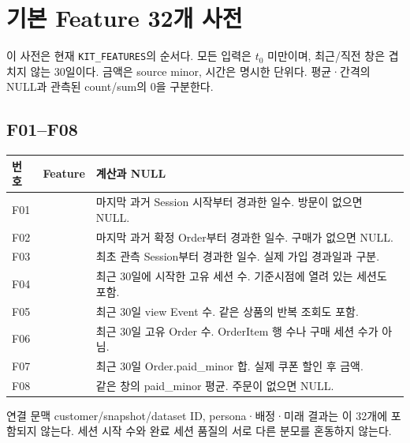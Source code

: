 \documentclass[11pt,a4paper]{article}
\newcommand{\code}[1]{{\ttfamily\footnotesize\nolinkurl{#1}}}
\newcommand{\page}{\clearpage}
\newcommand{\thead}{\rowcolor{pale}}
\begin{document}
\page
\section{기본 Feature 32개 사전}
이 사전은 현재 \code{KIT_FEATURES}의 순서다. 모든 입력은 $t_0$ 미만이며, 최근/직전 창은 겹치지 않는 30일이다. 금액은 source minor, 시간은 명시한 단위다. 평균·간격의 NULL과 관측된 count/sum의 0을 구분한다.

\subsection*{F01--F08}
\begin{tabularx}{\linewidth}{@{}P{.065\linewidth}P{.36\linewidth}Y@{}}\thead 번호 & Feature & 계산과 NULL\\\midrule
F01 & {\ttfamily\scriptsize{}} & 마지막 과거 Session 시작부터 경과한 일수. 방문이 없으면 NULL. \\[5pt]
F02 & {\ttfamily\scriptsize{}} & 마지막 과거 확정 Order부터 경과한 일수. 구매가 없으면 NULL. \\[5pt]
F03 & {\ttfamily\scriptsize{}} & 최초 관측 Session부터 경과한 일수. 실제 가입 경과일과 구분. \\[5pt]
F04 & {\ttfamily\scriptsize{}} & 최근 30일에 시작한 고유 세션 수. 기준시점에 열려 있는 세션도 포함. \\[5pt]
F05 & {\ttfamily\scriptsize{}} & 최근 30일 view Event 수. 같은 상품의 반복 조회도 포함. \\[5pt]
F06 & {\ttfamily\scriptsize{}} & 최근 30일 고유 Order 수. OrderItem 행 수나 구매 세션 수가 아님. \\[5pt]
F07 & {\ttfamily\scriptsize{}} & 최근 30일 Order.paid\_minor 합. 실제 쿠폰 할인 후 금액. \\[5pt]
F08 & {\ttfamily\scriptsize{}} & 같은 창의 paid\_minor 평균. 주문이 없으면 NULL. \\[5pt]
\bottomrule\end{tabularx}
연결 문맥 customer/snapshot/dataset ID, persona·배정·미래 결과는 이 32개에 포함되지 않는다. 세션 시작 수와 완료 세션 품질의 서로 다른 분모를 혼동하지 않는다.
\page
\end{document}

